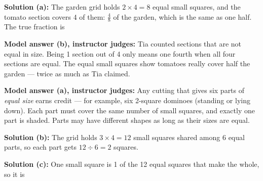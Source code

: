 \documentclass[12pt]{article}
\begin{document}
\textbf{Solution (a):} The garden grid holds $2 \times 4 = 8$ equal small
squares, and the tomato section covers 4 of them: $\tfrac{4}{8}$ of the garden,
which is the same as one half. The true fraction is 

\textbf{Model answer (b), instructor judges:} Tia counted sections that are not
equal in size. Being 1 section out of 4 only means one fourth when all four
sections are equal. The equal small squares show tomatoes really cover half
the garden --- twice as much as Tia claimed.


\textbf{Model answer (a), instructor judges:} Any cutting that gives six parts
of \emph{equal size} earns credit --- for example, six 2-square dominoes
(standing or lying down). Each part must cover the same number of small
squares, and exactly one part is shaded. Parts may have different shapes as
long as their sizes are equal.

\textbf{Solution (b):} The grid holds $3 \times 4 = 12$ small squares shared
among 6 equal parts, so each part gets $12 \div 6 = 2$ squares. 

\textbf{Solution (c):} One small square is 1 of the 12 equal squares that make
the whole, so it is 
\end{document}
